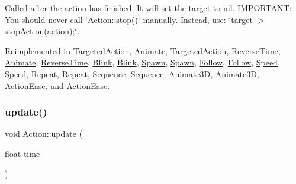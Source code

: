 Called after the action has finished. It will set the \textquotesingle{}target\textquotesingle{} to nil. I\+M\+P\+O\+R\+T\+A\+NT\+: You should never call \char`\"{}\+Action\+::stop()\char`\"{} manually. Instead, use\+: \char`\"{}target-\/$>$stop\+Action(action);\char`\"{}. 

Reimplemented in \hyperlink{classTargetedAction_a006f4ba95607369684770186588d12ce}{Targeted\+Action}, \hyperlink{classAnimate_acca8e3d000ced3182958b87e531ac423}{Animate}, \hyperlink{classTargetedAction_a688769917c245a9f885bbe49a73e37fa}{Targeted\+Action}, \hyperlink{classReverseTime_ab4fbd1a9abd412981366ae8a7782180e}{Reverse\+Time}, \hyperlink{classAnimate_a546b7b7817303ad58f57c6c97d64c4ed}{Animate}, \hyperlink{classReverseTime_af59bd73c03add3be189a371f5f338b72}{Reverse\+Time}, \hyperlink{classBlink_a081f03902fb69d5b4ec0fddf0ee72b60}{Blink}, \hyperlink{classBlink_ac2299db1e757e2911e35ee9c88fc477c}{Blink}, \hyperlink{classSpawn_a6b4b872928f24b722fda9d7428178a56}{Spawn}, \hyperlink{classSpawn_ab743d2f0b325be11b8939162d9d8984c}{Spawn}, \hyperlink{classFollow_af3b58aa360668e6e1203a48f23276b74}{Follow}, \hyperlink{classFollow_a2cd8dbd76066ecb517c6d5bdca032d6c}{Follow}, \hyperlink{classSpeed_a7580890ff2db1634273c0b726c023098}{Speed}, \hyperlink{classSpeed_afc0df0c91cfcb119182fec7ccf470f45}{Speed}, \hyperlink{classRepeat_a53b3a08574698685425cd7c55645e57a}{Repeat}, \hyperlink{classRepeat_ae7d7d020a49dbbe3ee160fe22db02ad2}{Repeat}, \hyperlink{classSequence_a66d72eff9f99dfff3f0ac09d280f4360}{Sequence}, \hyperlink{classSequence_a14332cc490ebbbb1c372eff0dc4cd025}{Sequence}, \hyperlink{classAnimate3D_af37f00e045b7dc5cd1a0c54a4f4f8042}{Animate3D}, \hyperlink{classAnimate3D_a9d27a950ce7942a73a392936951fc263}{Animate3D}, \hyperlink{classActionEase_a1a12083389f0bec7b1de3ef2c832597a}{Action\+Ease}, and \hyperlink{classActionEase_a2f9afe79f5848689a7f6f54c55764275}{Action\+Ease}.

\mbox{\label{classAction_a937e646e63915e33ad05ba149bfcf239}} 
\subsubsection{\texorpdfstring{update()}{update()}\hspace{0.1cm}{\footnotesize\ttfamily [1/2]}}
{\footnotesize\ttfamily void Action\+::update (\begin{DoxyParamCaption}\item[{float}]{time }\end{DoxyParamCaption})\hspace{0.3cm}{\ttfamily [virtual]}}

